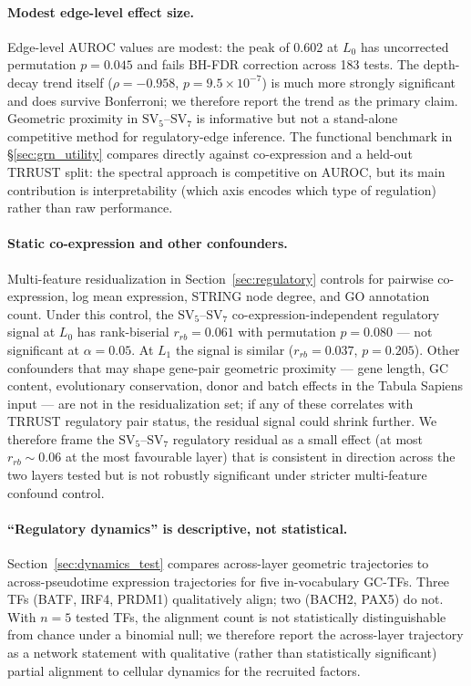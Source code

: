 \documentclass[12pt]{article}
\newcommand{\SV}[1]{\mathrm{SV}_{#1}}
\begin{document}
\paragraph{Modest edge-level effect size.}
Edge-level AUROC values are modest: the peak of 0.602 at $L_0$ has uncorrected permutation $p = 0.045$ and fails BH-FDR correction across 183 tests.
The depth-decay trend itself ($\rho = -0.958$, $p = 9.5 \times 10^{-7}$) is much more strongly significant and does survive Bonferroni; we therefore report the trend as the primary claim.
Geometric proximity in $\SV{5}$--$\SV{7}$ is informative but not a stand-alone competitive method for regulatory-edge inference.
The functional benchmark in §\ref{sec:grn_utility} compares directly against co-expression and a held-out TRRUST split: the spectral approach is competitive on AUROC, but its main contribution is interpretability (which axis encodes which type of regulation) rather than raw performance.

\paragraph{Static co-expression and other confounders.}
Multi-feature residualization in Section~\ref{sec:regulatory} controls for pairwise co-expression, log mean expression, STRING node degree, and GO annotation count.
Under this control, the $\SV{5}$--$\SV{7}$ co-expression-independent regulatory signal at $L_0$ has rank-biserial $r_{rb} = 0.061$ with permutation $p = 0.080$ --- not significant at $\alpha = 0.05$.
At $L_1$ the signal is similar ($r_{rb} = 0.037$, $p = 0.205$).
Other confounders that may shape gene-pair geometric proximity --- gene length, GC content, evolutionary conservation, donor and batch effects in the Tabula Sapiens input --- are not in the residualization set; if any of these correlates with TRRUST regulatory pair status, the residual signal could shrink further.
We therefore frame the $\SV{5}$--$\SV{7}$ regulatory residual as a small effect (at most $r_{rb} \sim 0.06$ at the most favourable layer) that is consistent in direction across the two layers tested but is not robustly significant under stricter multi-feature confound control.

\paragraph{``Regulatory dynamics'' is descriptive, not statistical.}
Section~\ref{sec:dynamics_test} compares across-layer geometric trajectories to across-pseudotime expression trajectories for five in-vocabulary GC-TFs.
Three TFs (BATF, IRF4, PRDM1) qualitatively align; two (BACH2, PAX5) do not.
With $n = 5$ tested TFs, the alignment count is not statistically distinguishable from chance under a binomial null; we therefore report the across-layer trajectory as a network statement with qualitative (rather than statistically significant) partial alignment to cellular dynamics for the recruited factors.
\end{document}
